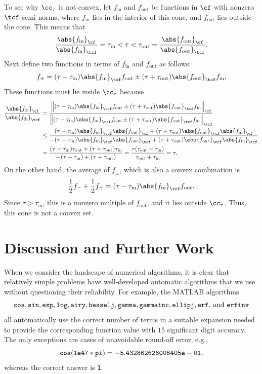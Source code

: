 \documentclass[]{elsarticle}
\theoremstyle{definition}
\theoremstyle{remark}
\newcommand{\Fnorm}[1]{\abs{#1}_{\cf}}
\newcommand{\Ftnorm}[1]{\abs{#1}_{\tcf}}
\begin{document}
To see why $\cc_{\tau}$ is not convex, let $f_{\text{in}}$ and $f_{\text{out}}$ be functions in $\cf$ with nonzero $\tcf$-semi-norms, where $f_{\text{in}}$  lies in the interior of this cone, and $f_{\text{out}}$ lies outside the cone.  This means that 
\[
\frac{\Fnorm{f_{\text{in}}}} {\Ftnorm{f_{\text{in}}}} = \tau_{\text{in}} < \tau < \tau_{\text{out}} =  \frac{\Fnorm{f_{\text{out}}}} {\Ftnorm{f_{\text{out}}}}.
\]
Next define two functions in terms of $f_{\text{in}}$ and $f_{\text{out}}$ as follows:
\[
f_{\pm} = (\tau-\tau_{\text{in}}) \Ftnorm{f_{\text{in}}} f_{\text{out}}  \pm (\tau + \tau_{\text{out}}) \Ftnorm{f_{\text{out}}} f_{\text{in}},
\]
These functions must lie inside  $\cc_{\tau}$ because
\begin{align*}
\frac{\Fnorm{f_{\pm}}} {\Ftnorm{f_{\pm}}} 
&= \frac{\Bigl \lVert (\tau-\tau_{\text{in}}) \Ftnorm{f_{\text{in}}} f_{\text{out}}  \pm (\tau + \tau_{\text{out}}) \Ftnorm{f_{\text{out}}} f_{\text{in}}\Bigr \rVert_{\cf}}
{\Bigl \lVert (\tau-\tau_{\text{in}}) \Ftnorm{f_{\text{in}}} f_{\text{out}}  \pm (\tau + \tau_{\text{out}}) \Ftnorm{f_{\text{out}}} f_{\text{in}}\Bigr \rVert_{\tcf}}\\
& \le 
\frac{(\tau-\tau_{\text{in}}) \Ftnorm{f_{\text{in}}} \Fnorm{f_{\text{out}}}  + (\tau + \tau_{\text{out}}) \Ftnorm{f_{\text{out}}} \Fnorm{f_{\text{in}}}}
{-(\tau-\tau_{\text{in}}) \Ftnorm{f_{\text{in}}} \Ftnorm{f_{\text{out}}}  + (\tau + \tau_{\text{out}}) \Ftnorm{f_{\text{out}}} \Ftnorm{f_{\text{in}}}}\\
& =
\frac{(\tau-\tau_{\text{in}})\tau_{\text{out}}  + (\tau + \tau_{\text{out}}) \tau_{\text{in}} } {-(\tau-\tau_{\text{in}}) + (\tau + \tau_{\text{out}})}
=
\frac{\tau (\tau_{\text{out}} +\tau_{\text{in}}) } {\tau_{\text{out}} + \tau_{\text{in}}} =  \tau.
\end{align*}
On the other hand, the average of $f_{\pm}$, which is also a convex combination is 
\[
\frac{1}{2} f_- + \frac{1}{2} f_+ = (\tau-\tau_{\text{in}}) \Ftnorm{f_{\text{in}}} f_{\text{out}}.
\]
Since $\tau > \tau_{\text{in}}$, this is a nonzero multiple of $f_{\text{out}}$, and it lies outside $\cc_{\tau}$.  Thus, this cone is not a convex set.


\section{Discussion and Further Work} \label{furthersec}

When we consider the landscape of numerical algorithms, it is clear that relatively simple problems have well-developed automatic algorithms that we use without questioning their reliability.  For example, the MATLAB \cite{MAT7.12} algorithms
\[
{\tt cos, sin, exp, log, airy, besselj, gamma, gammainc, ellipj, erf,} \text{ and } {\tt  erfinv}
\] 
all automatically use the correct number of terms in a suitable expansion needed to provide the corresponding function value with $15$ significant digit accuracy. The only exceptions are cases of unavoidable round-off error, e.g., 
\[
{\tt cos(1e47*pi)= -5.432862626006405e-01},
\]
whereas the correct answer is {\tt 1}.  
\end{document}
